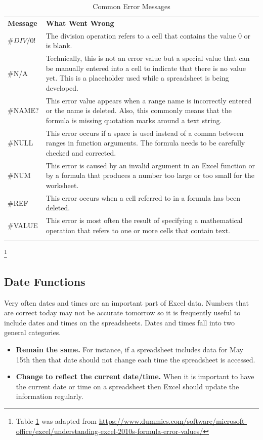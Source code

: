 {\small
	\begin{longtable}{p{0.75in}p{3.50in}} %
		\textbf{Message} & \textbf{What Went Wrong} \endhead
		\hline \\
		$ \#DIV/0! $ & The division operation refers to a cell that contains the value $ 0 $ or is blank.\\
		\#N/A & Technically, this is not an error value but a special value 		that can be manually entered into a cell to indicate that there is no value yet. This is a placeholder used while a spreadsheet is being developed.\\
		\#NAME? & This error value appears when a range name is incorrectly entered or the name is deleted. Also, this commonly means that the formula is missing quotation marks around a text string.\\
		\#NULL & This error occurs if a space is used instead of a comma between ranges in function arguments. The formula needs to be carefully checked and corrected.\\
		\#NUM & This error is caused by an invalid argument in an Excel	function or by a formula that produces a number too large or too small for the worksheet.\\
		\#REF & This error occurs when a cell referred to in a formula has been deleted.\\
		\#VALUE & This error is most often the result of specifying a mathematical operation that refers to one or more cells that contain text.\\
		\caption{Common Error Messages}
		\label{03:tab01}
	\end{longtable}
}

\footnote{Table \ref{03:tab01} was adapted from  \url{https://www.dummies.com/software/microsoft-office/excel/understanding-excel-2010s-formula-error-values/}}

\subsection{Date Functions}

Very often dates and times are an important part of Excel data. Numbers that are correct today may not be accurate tomorrow so it is frequently useful to include dates and times on the spreadsheets. Dates and times fall into two general categories.

\begin{itemize}
	\item \textbf{Remain the same.} For instance, if a spreadsheet includes data for May 15th then that date should not change each time the spreadsheet is accessed.
	\item \textbf{Change to reflect the current date/time.} When it is important to have the current date or time on a spreadsheet then Excel should update the information regularly.
\end{itemize}

